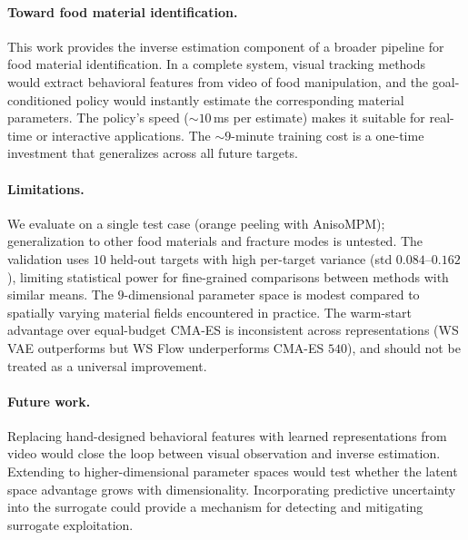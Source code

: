 \paragraph{Toward food material identification.}
This work provides the inverse estimation component of a broader pipeline for food material identification. In a complete system, visual tracking methods~\cite{wu2025fruitninja, xie2024physgaussian} would extract behavioral features from video of food manipulation, and the goal-conditioned policy would instantly estimate the corresponding material parameters. The policy's speed (${\sim}10$\,ms per estimate) makes it suitable for real-time or interactive applications. The ${\sim}9$-minute training cost is a one-time investment that generalizes across all future targets.

\paragraph{Limitations.}
We evaluate on a single test case (orange peeling with AnisoMPM); generalization to other food materials and fracture modes is untested. The validation uses $10$ held-out targets with high per-target variance (std $0.084$--$0.162$), limiting statistical power for fine-grained comparisons between methods with similar means. The $9$-dimensional parameter space is modest compared to spatially varying material fields encountered in practice. The warm-start advantage over equal-budget CMA-ES is inconsistent across representations (WS VAE outperforms but WS Flow underperforms CMA-ES $540$), and should not be treated as a universal improvement.

\paragraph{Future work.}
Replacing hand-designed behavioral features with learned representations from video would close the loop between visual observation and inverse estimation. Extending to higher-dimensional parameter spaces would test whether the latent space advantage grows with dimensionality. Incorporating predictive uncertainty into the surrogate could provide a mechanism for detecting and mitigating surrogate exploitation.
